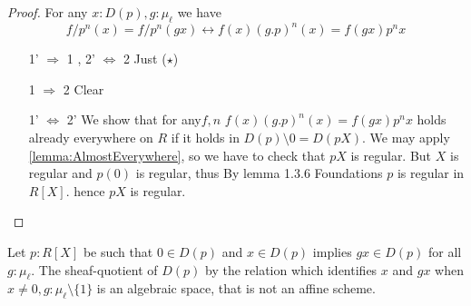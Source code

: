 \begin{proof}
	For any $x : D(p), g : \mu_\ell$ we have 
	\[
	f/p^n (x) = f/p^n(g x)  \leftrightarrow f(x) (g.p)^n (x) = f(gx) p^n x \tag{$\star$}
	\]
	\begin{enumerate}
		\item [1' $\Rightarrow$ 1 , 2' $\Leftrightarrow$ 2] Just ($\star$)
		\item [1 $\Rightarrow$ 2] Clear
		\item [1' $\Leftrightarrow$ 2'] We show that for any$ f , n$ $f(x) (g.p)^n (x) = f(gx) p^n x $ holds already everywhere on $R$ if it holds in $D(p) \setminus 0 = D(pX)$. %
		We may apply \ref{lemma:AlmostEverywhere}, so we have to check that $p X$  is regular. But $X$ is regular and $p(0)$ is regular, thus By lemma 1.3.6 Foundations \todocite $p$ is regular in $R[X]$. hence $p X$ is regular. %
	\end{enumerate}
\end{proof}
\begin{lemma}
	Let $p : R[X]$ be such that $0 \in D(p)$ and $x \in D(p)$ implies $gx \in D(p)$ for all $g : \mu_\ell$.
	The sheaf-quotient of $D(p)$ by the relation which identifies $x$ and $gx$ when $x \neq 0, g : \mu_\ell \setminus \{1\}$ is an algebraic space, that is not an affine scheme.
\end{lemma}
